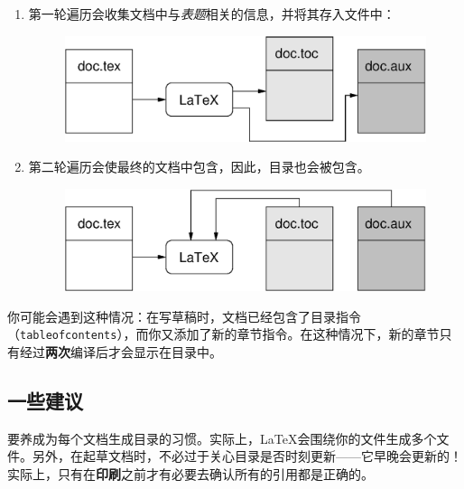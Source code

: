 \begin{enumerate}
  \item 第一轮遍历会收集文档中与\emph{表题}相关的信息，并将其存入文件中：
  
  \begin{figure}[ht]
    \begin{center}
      \includegraphics{img/toc1.eps}
    \end{center}
  \end{figure}

  \item 第二轮遍历会使最终的文档中包含，因此，目录也会被包含。
  
  \begin{figure}[ht]
    \begin{center}
      \includegraphics{img/toc2.eps}
    \end{center}
  \end{figure}

\end{enumerate}

你可能会遇到这种情况：在写草稿时，文档已经包含了目录指令（\verb|tableofcontents|），而你又添加了新的章节指令。在这种情况下，新的章节只有经过\textbf{两次}编译后才会显示在目录中。

\subsection{一些建议}

要养成为每个文档生成目录的习惯。实际上，\LaTeX 会围绕你的文件生成多个文件。另外，在起草文档时，不必过于关心目录是否时刻更新——它早晚会更新的！实际上，只有在\textbf{印刷}之前才有必要去确认所有的引用都是正确的。


